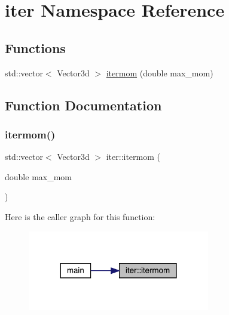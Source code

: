 \hypertarget{namespaceiter}{}\section{iter Namespace Reference}
\label{namespaceiter}
\subsection*{Functions}
\begin{DoxyCompactItemize}
\item 
std\+::vector$<$ Vector3d $>$ \mbox{\hyperlink{namespaceiter_aa428f19b82dc5b65f03be5db13925f71}{itermom}} (double max\+\_\+mom)
\end{DoxyCompactItemize}


\subsection{Function Documentation}
\mbox{\label{namespaceiter_aa428f19b82dc5b65f03be5db13925f71}} 
\subsubsection{\texorpdfstring{itermom()}{itermom()}}
{\footnotesize\ttfamily std\+::vector$<$ Vector3d $>$ iter\+::itermom (\begin{DoxyParamCaption}\item[{double}]{max\+\_\+mom }\end{DoxyParamCaption})}

Here is the caller graph for this function\+:\nopagebreak
\begin{figure}[H]
\begin{center}
\leavevmode
\includegraphics[width=225pt]{d1/d0f/namespaceiter_aa428f19b82dc5b65f03be5db13925f71_icgraph}
\end{center}
\end{figure}
